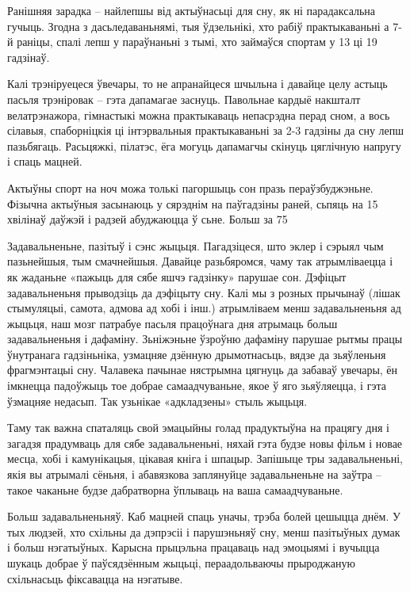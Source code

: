 Ранішняя зарадка – найлепшы від актыўнасьці для сну, як ні парадаксальна гучыць. Згодна з дасьледаваньнямі, тыя ўдзельнікі, хто рабіў практыкаваньні а 7-й раніцы, спалі лепш у параўнаньні з тымі, хто займаўся спортам у 13 ці 19 гадзінаў.

Калі трэніруецеся ўвечары, то не апранайцеся шчыльна і давайце целу астыць пасьля трэніровак – гэта дапамагае заснуць. Павольнае кардыё накшталт велатрэнажора, гімнастыкі можна практыкаваць непасрэдна перад сном, а вось сілавыя, спаборніцкія ці інтэрвальныя практыкаваньні за 2-3 гадзіны да сну лепш пазьбягаць. Расьцяжкі, пілатэс, ёга могуць дапамагчы скінуць цяглічную напругу і спаць мацней.

Актыўны спорт на ноч можа толькі пагоршыць сон празь пераўзбуджэньне. Фізычна актыўныя засынаюць у сярэднім на паўгадзіны раней, сьпяць на 15 хвілінаў даўжэй і радзей абуджаюцца ў сьне. Больш за 75%

Задавальненьне, пазітыў і сэнс жыцьця. Пагадзіцеся, што эклер і сэрыял чым пазьнейшыя, тым смачнейшыя. Давайце разьбяромся, чаму так атрымліваецца і як жаданьне «пажыць для сябе яшчэ гадзінку» парушае сон. Дэфіцыт задавальненьня прыводзіць да дэфіцыту сну. Калі мы з розных прычынаў (лішак стымуляцыі, самота, адмова ад хобі і інш.) атрымліваем менш задавальненьня ад жыцьця, наш мозг патрабуе пасьля працоўнага дня атрымаць больш задавальненьня і дафаміну. Зьніжэньне ўзроўню дафаміну парушае рытмы працы ўнутранага гадзіньніка, узмацняе дзённую дрымотнасьць, вядзе да зьяўленьня фрагмэнтацыі сну. Чалавека пачынае нястрымна цягнуць да забаваў увечары, ён імкнецца падоўжыць тое добрае самаадчуваньне, якое ў яго зьяўляецца, і гэта ўзмацняе недасып. Так узьнікае «адкладзены» стыль жыцьця.

Таму так важна спаталяць свой эмацыйны голад прадуктыўна на працягу дня і загадзя прадумваць для сябе задавальненьні, няхай гэта будзе новы фільм і новае месца, хобі і камунікацыя, цікавая кніга і шпацыр. Запішыце тры задавальненьні, якія вы атрымалі сёньня, і абавязкова заплянуйце задавальненьне на заўтра – такое чаканьне будзе дабратворна ўплываць на ваша самаадчуваньне.

Больш задавальненьняў. Каб мацней спаць уначы, трэба болей цешыцца днём. У тых людзей, хто схільны да дэпрэсіі і парушэньняў сну, менш пазітыўных думак і больш нэгатыўных. Карысна прыцэльна працаваць над эмоцыямі і вучыцца шукаць добрае ў паўсядзённым жыцьці, пераадольваючы прыроджаную схільнасьць фіксавацца на нэгатыве.

